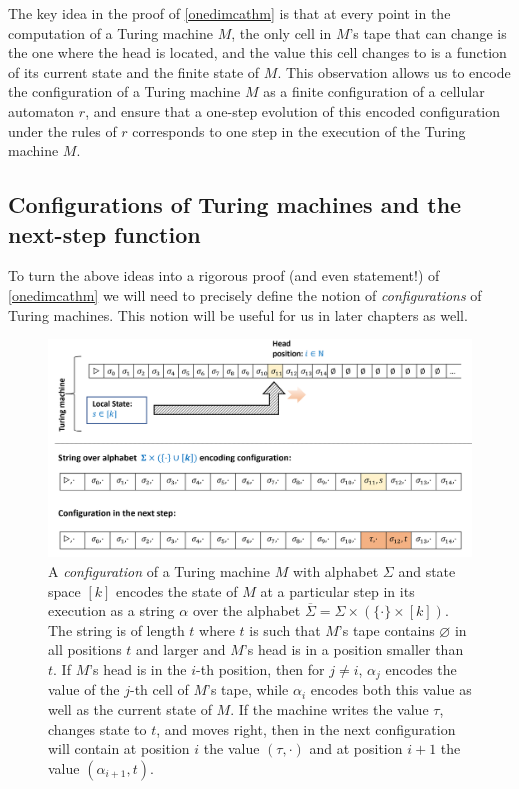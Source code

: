 The key idea in the proof of \cref{onedimcathm} is that at every point
in the computation of a Turing machine \(M\), the only cell in \(M\)'s
tape that can change is the one where the head is located, and the value
this cell changes to is a function of its current state and the finite
state of \(M\). This observation allows us to encode the configuration
of a Turing machine \(M\) as a finite configuration of a cellular
automaton \(r\), and ensure that a one-step evolution of this encoded
configuration under the rules of \(r\) corresponds to one step in the
execution of the Turing machine \(M\).

\subsection{Configurations of Turing machines and the next-step
function}\label{turingmachinesconfigsec}

To turn the above ideas into a rigorous proof (and even statement!) of
\cref{onedimcathm} we will need to precisely define the notion of
\emph{configurations} of Turing machines. This notion will be useful for
us in later chapters as well.


\begin{figure}
\centering
\includegraphics[width=\textwidth, height=0.25\paperheight, keepaspectratio]{../figure/turingmachineconf.png}
\caption{A \emph{configuration} of a Turing machine \(M\) with alphabet
\(\Sigma\) and state space \([k]\) encodes the state of \(M\) at a
particular step in its execution as a string \(\alpha\) over the
alphabet \(\overline{\Sigma} = \Sigma \times (\{\cdot \} \times [k])\).
The string is of length \(t\) where \(t\) is such that \(M\)'s tape
contains \(\varnothing\) in all positions \(t\) and larger and \(M\)'s
head is in a position smaller than \(t\). If \(M\)'s head is in the
\(i\)-th position, then for \(j \neq i\), \(\alpha_j\) encodes the value
of the \(j\)-th cell of \(M\)'s tape, while \(\alpha_i\) encodes both
this value as well as the current state of \(M\). If the machine writes
the value \(\tau\), changes state to \(t\), and moves right, then in the
next configuration will contain at position \(i\) the value
\((\tau,\cdot)\) and at position \(i+1\) the value
\((\alpha_{i+1},t)\).}
\label{turingconfigfig}
\end{figure}

